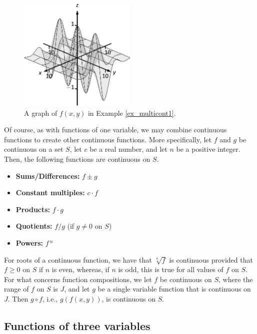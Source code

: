 \begin{example}
\begin{figure}[H]
	\begin{center}
			\includegraphics[width=0.5\textwidth]{fig_multi_var_8}
	\caption{A graph of $f(x,y)$ in Example \ref{ex_multicont1}.}
	\label{fig_multi_var_8}
	\end{center}
\end{figure}


\end{example}

Of course, as with functions of one variable, we may combine continuous functions to create other continuous functions. More specifically, let $f$ and $g$ be continuous on a set $S$, let $c$ be a real number, and let $n$ be a positive integer. Then, the following functions are continuous on $S$.
		\begin{itemize}
		\item		\textbf{Sums/Differences:}	$f\pm g$
		\item		\textbf{Constant multiples:}	$c\cdot f$
		\item		\textbf{Products:}	$f\cdot g$
		\item		\textbf{Quotients:}	$f/g$ \qquad  (if $g\neq 0$ on $S$)
		\item		\textbf{Powers:}	$f\,^n$
\end{itemize}
For roots of a continuous function, we have that $\sqrt[n]{f}$ is continuous provided that $f\geq 0$ on $S$ if $n$ is even, whereas, if $n$ is odd, this is true for all values of $f$ on $S$. For what concerns function compositions, we let $f$ be continuous on $S$, where the range of $f$ on $S$ is $J$, and let $g$ be a single variable function that is continuous on $J$. Then $g\circ f$, i.e., $g(f(x,y))$, is continuous on $S$.

\ifcalculus
\subsection{Functions of three variables}

